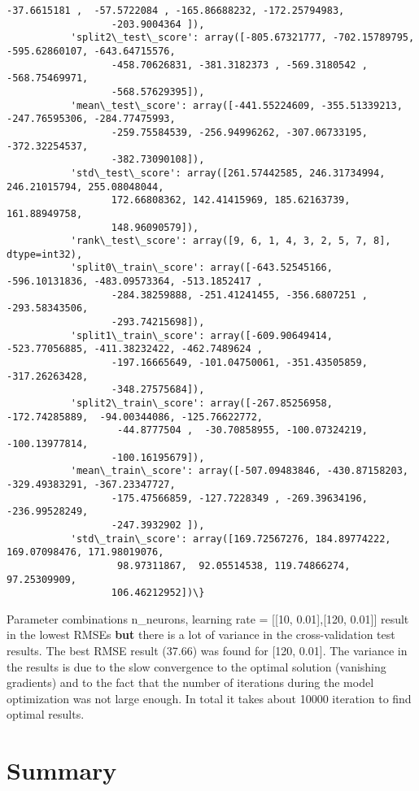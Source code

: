 \documentclass[11pt]{article}
\begin{document}
\begin{Verbatim}[commandchars=\\\{\}]
                   -37.6615181 ,  -57.5722084 , -165.86688232, -172.25794983,
                  -203.9004364 ]),
           'split2\_test\_score': array([-805.67321777, -702.15789795, -595.62860107, -643.64715576,
                  -458.70626831, -381.3182373 , -569.3180542 , -568.75469971,
                  -568.57629395]),
           'mean\_test\_score': array([-441.55224609, -355.51339213, -247.76595306, -284.77475993,
                  -259.75584539, -256.94996262, -307.06733195, -372.32254537,
                  -382.73090108]),
           'std\_test\_score': array([261.57442585, 246.31734994, 246.21015794, 255.08048044,
                  172.66808362, 142.41415969, 185.62163739, 161.88949758,
                  148.96090579]),
           'rank\_test\_score': array([9, 6, 1, 4, 3, 2, 5, 7, 8], dtype=int32),
           'split0\_train\_score': array([-643.52545166, -596.10131836, -483.09573364, -513.1852417 ,
                  -284.38259888, -251.41241455, -356.6807251 , -293.58343506,
                  -293.74215698]),
           'split1\_train\_score': array([-609.90649414, -523.77056885, -411.38232422, -462.7489624 ,
                  -197.16665649, -101.04750061, -351.43505859, -317.26263428,
                  -348.27575684]),
           'split2\_train\_score': array([-267.85256958, -172.74285889,  -94.00344086, -125.76622772,
                   -44.8777504 ,  -30.70858955, -100.07324219, -100.13977814,
                  -100.16195679]),
           'mean\_train\_score': array([-507.09483846, -430.87158203, -329.49383291, -367.23347727,
                  -175.47566859, -127.7228349 , -269.39634196, -236.99528249,
                  -247.3932902 ]),
           'std\_train\_score': array([169.72567276, 184.89774222, 169.07098476, 171.98019076,
                   98.97311867,  92.05514538, 119.74866274,  97.25309909,
                  106.46212952])\}
\end{Verbatim}       
Parameter combinations n\_neurons, learning rate = {[}{[}10, 0.01{]},{[}120, 0.01{]}{]} result in the lowest RMSEs \textbf{but} there is a lot of variance in the cross-validation test results. The best RMSE result (37.66) was found for {[}120, 0.01{]}. The variance in the results is due to the slow convergence to the optimal solution (vanishing gradients) and to the fact that the number of iterations during the model optimization was not large enough. In total it takes about 10000 iteration to find optimal results. 

    \hypertarget{summary}{%
\section{Summary}\label{summary}}
\end{document}
